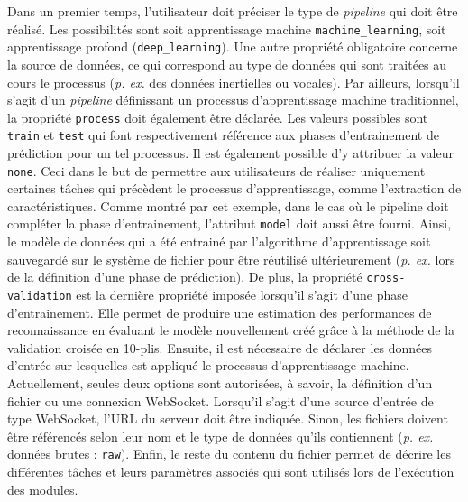 Dans un premier temps, l'utilisateur doit préciser le type de \textit{pipeline} qui doit être réalisé. Les possibilités sont soit apprentissage machine \texttt{machine\_learning}, soit apprentissage profond (\texttt{deep\_learning}). Une autre propriété obligatoire concerne la source de données, ce qui correspond au type de données qui sont traitées au cours le processus (\textit{p. ex.} des données inertielles ou vocales). Par ailleurs, lorsqu'il s'agit d'un \textit{pipeline} définissant un processus d'apprentissage machine traditionnel, la propriété \texttt{process} doit également être déclarée. Les valeurs possibles sont \texttt{train} et \texttt{test} qui font respectivement référence aux phases d'entrainement de prédiction pour un tel processus. Il est également possible d'y attribuer la valeur \texttt{none}. Ceci dans le but de permettre aux utilisateurs de réaliser uniquement certaines tâches qui précèdent le processus d'apprentissage, comme l'extraction de caractéristiques. Comme montré par cet exemple, dans le cas où le pipeline doit compléter la phase d'entrainement, l'attribut \texttt{model} doit aussi être fourni. Ainsi, le modèle de données qui a été entrainé par l'algorithme d'apprentissage soit sauvegardé sur le système de fichier pour être réutilisé ultérieurement (\textit{p. ex.} lors de la définition d'une phase de prédiction). De plus, la propriété \texttt{cross-validation} est la dernière propriété imposée lorsqu'il s'agit d'une phase d'entrainement. Elle permet de produire une estimation des performances de reconnaissance en évaluant le modèle nouvellement créé grâce à la méthode de la validation croisée en 10-plis. Ensuite, il est nécessaire de déclarer les données d'entrée sur lesquelles est appliqué le processus d'apprentissage machine. Actuellement, seules deux options sont autorisées, à savoir, la définition d'un fichier ou une connexion WebSocket. Lorsqu'il s'agit d'une source d'entrée de type WebSocket, l'\acs{URL} du serveur doit être indiquée. Sinon, les fichiers doivent être référencés selon leur nom et le type de données qu'ils contiennent (\textit{p. ex.} données brutes : \texttt{raw}). Enfin, le reste du contenu du fichier permet de décrire les différentes tâches et leurs paramètres associés qui sont utilisés lors de l'exécution des modules.

